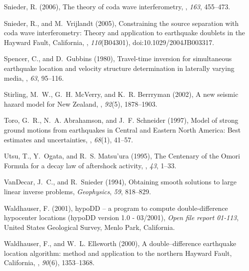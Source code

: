 \documentclass[12pt,double]{article}
\begin{document}
\begin{thebibliography}{45}
Snieder, R. (2006), The theory of coda wave interferometry, \pag, 
\textit{163}, 455--473.

Snieder, R., and M.~Vrijlandt (2005), Constraining the source separation with
  coda wave interferometry: Theory and application to earthquake doublets in
  the {H}ayward {F}ault, {C}alifornia, \jgr, \textit{110}(B04301), doi:10.1029/2004JB003317.

Spencer, C., and D.~Gubbins (1980), Travel-time inversion for simultaneous
  earthquake location and velocity structure determination in laterally varying
  media, \gjras,
  \textit{63}, 95--116.

Stirling, M.~W., G.~H. Mc{V}erry, and K.~R. Berrryman (2002), A new seismic
  hazard model for {N}ew {Z}ealand, \bssa, \textit{92}(5), 1878--1903.

Toro, G.~R., N.~A. Abrahamson, and J.~F. Schneider (1997), Model of strong
  ground motions from earthquakes in {C}entral and {E}astern {N}orth {A}merica:
  {B}est estimates and uncertainties, \srl,
  \textit{68}(1), 41--57.

Utsu, T., Y.~Ogata, and R.~S. Matsu'ura (1995), The {C}entenary of the {O}mori
  {F}ormula for a decay law of aftershock activity, \jpe, \textit{43}, 1--33.

Van{D}ecar, J.~C., and R.~Snieder (1994), Obtaining smooth solutions to large
  linear inverse problems, \textit{Geophysics}, \textit{59}, 818--829.

Waldhauser, F. (2001), hypo{DD} -- a program to compute double-difference
  hypocenter locations (hypo{DD} version 1.0 - 03/2001), \textit{Open file
  report 01-113}, United States Geological Survey, Menlo Park, California.

Waldhauser, F., and W.~L. Ellsworth (2000), A double--difference earthquake
  location algorithm: method and application to the northern {H}ayward {F}ault,
  {C}alifornia, \bssa,
  \textit{90}(6), 1353--1368.


\end{thebibliography}
\end{document}
